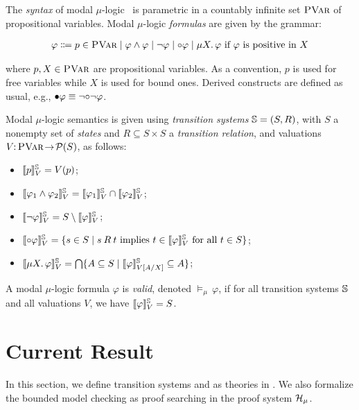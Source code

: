 \documentclass{almostllncs}
\begin{document}
The \emph{syntax} of modal $\mu$-logic~\cite{Koz82} is parametric in a countably infinite set ${\normalfont\textsc{PVar}}$ of propositional variables.
Modal $\mu$-logic \emph{formulas} are given by the grammar:

\vspace*{-3ex}
\begin{align*}
\varphi \Coloneqq
p \in {\normalfont\textsc{PVar}} \mid
\varphi \wedge \varphi \mid
\neg \varphi \mid 
{\circ} \varphi \mid
\mu X .\, \varphi \text{ if $\varphi$ is positive in $X$}
\end{align*}

where $p,X \in {\normalfont\textsc{PVar}}$ are propositional variables.
As a convention, $p$ is used for free variables
while $X$ is used for bound ones.
Derived constructs are defined as usual, e.g., 
${\bullet} \varphi \equiv \neg {\circ} \neg \varphi$.

Modal $\mu$-logic semantics is given using \emph{transition systems}
$\mathbb{S} = (S,R)$, with $S$ a nonempty set of \emph{states} and
$R \subseteq S \times S$ a \emph{transition relation}, and
valuations $V \!\colon\! {\normalfont\textsc{PVar}} \!\to\! \mathcal{P}(S)$, as follows:
\begin{itemize}
\item $\llbracket p\rrbracket^{\mathbb{S}}_V = V(p)$;
\item $\llbracket\varphi_1 \wedge \varphi_2\rrbracket^{\mathbb{S}}_V =
	  \llbracket\varphi_1\rrbracket^{\mathbb{S}}_V \cap \llbracket\varphi_2\rrbracket^{\mathbb{S}}_V$;
\item $\llbracket\neg \varphi\rrbracket^{\mathbb{S}}_V =
	  S \setminus \llbracket\varphi\rrbracket^{\mathbb{S}}_V$;    
\item $\llbracket{\circ} \varphi\rrbracket^{\mathbb{S}}_V =
      \{ s \in S \mid \text{$s \mathbin{R} t$ implies
	  $t \in \llbracket\varphi\rrbracket^{\mathbb{S}}_V$ for all $t \in S$} \}$;
\item $\llbracket\mu X .\, \varphi\rrbracket^{\mathbb{S}}_V =
	  \bigcap \{ A \subseteq S \mid 
	  \llbracket\varphi\rrbracket^{\mathbb{S}}_{V[A/X]} \subseteq A \}$;
\end{itemize}

A modal $\mu$-logic formula $\varphi$ is \emph{valid}, denoted ${\vDash_\mu} \, \varphi$, if for all transition systems $\mathbb{S}$ and all valuations $V$, we have $\llbracket\varphi\rrbracket^{\mathbb{S}}_V = S$.


\section{Current Result} \label{sec:current-result}

In this section, we define transition systems and \modmul as theories in \mmul.
We also formalize the bounded model checking as proof searching in the proof system $\mathcal{H}_\mu$.
\end{document}
